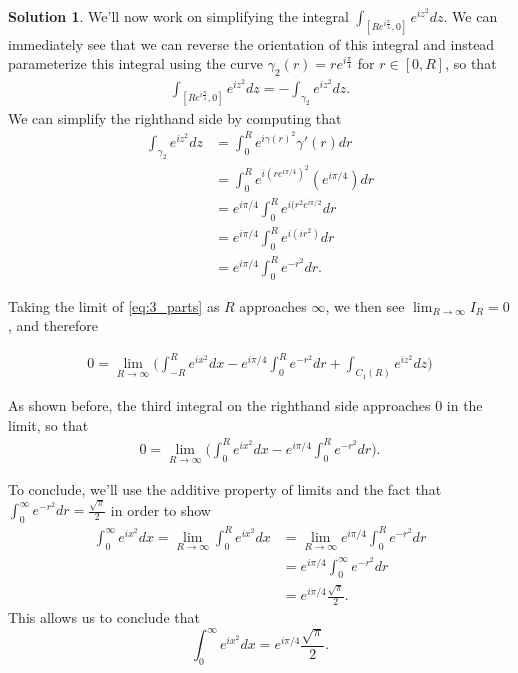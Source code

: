 \documentclass[12pt]{article}
\theoremstyle{definition}
\newtheorem{sol}{Solution}
\theoremstyle{remark}
\begin{document}
\begin{sol}
    We'll now work on simplifying the integral $\int_{[Re^{i\frac{\pi}{4}},0]} e^{iz^2}dz$. We can immediately see that we can reverse the orientation of this integral and instead parameterize this integral using the curve $\gamma_2(r) = re^{i \frac{\pi}{4}}$ for $r\in[0, R]$, so that 
    \begin{align}
        \int_{[Re^{i\frac{\pi}{4}},0]} e^{iz^2}dz = -\int_{\gamma_2} e^{iz^2}dz.
    \end{align}
    We can simplify the righthand side by computing that
    \begin{align}
        \int_{\gamma_2} e^{iz^2}dz &= \int_0^R e^{i\gamma(r)^2}\gamma'(r)dr\\
                                    &= \int_0^R e^{i(re^{i\pi/4})^2} (e^{i \pi/4}) dr\\
                                    &=  e^{i \pi/4} \int_0^R e^{i(r^2e^{i\pi/2}} dr \\
                                    &= e^{i \pi/4} \int_0^R e^{i(ir^2)} dr\\
                                    &= e^{i \pi/4} \int_0^R e^{-r^2} dr.
    \end{align}

Taking the limit of \ref{eq:3_parts} as $R$ approaches $\infty$, we then see $\lim_{R\to\infty} I_R = 0$, and therefore

\begin{align}
    0 = \lim\limits_{R\to\infty}\Big(\int_{-R}^{R} e^{ix^2}dx -e^{i \pi/4} \int_0^R e^{-r^2} dr +  \int_{C_1(R)}  e^{iz^2}dz \Big)
\end{align}

As shown before, the third integral on the righthand side approaches 0 in the limit, so that
\begin{align}
  0 = \lim\limits_{R\to\infty}\Big(\int_{0}^{R} e^{ix^2}dx -e^{i \pi/4} \int_0^R e^{-r^2} dr \Big).
\end{align}

To conclude, we'll use the additive property of limits and the fact that $\int_0^\infty e^{-r^2} dr = \frac{\sqrt{\pi}}{2}$ in order to show
\begin{align}
  \int_{0}^{\infty} e^{ix^2}dx =  \lim\limits_{R\to\infty}\int_{0}^{R} e^{ix^2}dx &=   \lim\limits_{R\to\infty} e^{i \pi/4} \int_0^R e^{-r^2} dr \\
                                                    &= e^{i \pi/4}  \int_0^\infty e^{-r^2} dr \\
                                                    &= e^{i \pi/4}  \frac{\sqrt{\pi}}{2}.
\end{align}
This allows us to conclude that 
\begin{equation}
    \int_{0}^{\infty} e^{ix^2}dx =  e^{i \pi/4}  \frac{\sqrt{\pi}}{2}.
\end{equation}
\end{sol}
\end{document}
